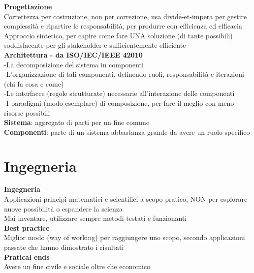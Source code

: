 \documentclass{article}
\begin{document}
		\textbf{Progettazione}\\
		Correttezza per costruzione, non per correzione, usa divide-et-impera per gestire complessità e ripartire le responsabilità, per produrre con efficienza ed efficacia\\
		Approccio sintetico, per capire come fare UNA soluzione (di tante possibili) soddisfacente per gli stakeholder e sufficientemente efficiente\\
		
		\textbf{Architettura - da ISO/IEC/IEEE 42010}\\
		-La decomposizione del sistema in componenti\\
		-L'organizzazione di tali componenti, definendo ruoli, responsabilità e iterazioni (chi fa cosa e come)\\
		-Le interfacce (regole strutturate) necessarie all'interazione delle componenti\\
		-I paradigmi (modo esemplare) di composizione, per fare il meglio con meno risorse possibili\\
		
		\textbf{Sistema}: aggregato di parti per un fine comune\\
		
		\textbf{Componenti}: parte di un sistema abbastanza grande da avere un ruolo specifico\\
		
		
		
		
		
		
		
		
		
		
		
		
		
			
	\clearpage
	\section{Ingegneria}
		\textbf{Ingegneria}\\
			Applicazioni principi matematici e scientifici a scopo pratico, NON per esplorare nuove possibilità o espandere la scienza\\
			Mai inventare, utilizzare sempre metodi testati e funzionanti\\
			
		\textbf{Best practice}\\
		Miglior modo (way of working) per raggiungere uno scopo, secondo applicazioni passate che hanno dimostrato i risultati\\
		
		\textbf{Pratical ends}\\
		Avere un fine civile e sociale oltre che economico\\
		
\end{document}
